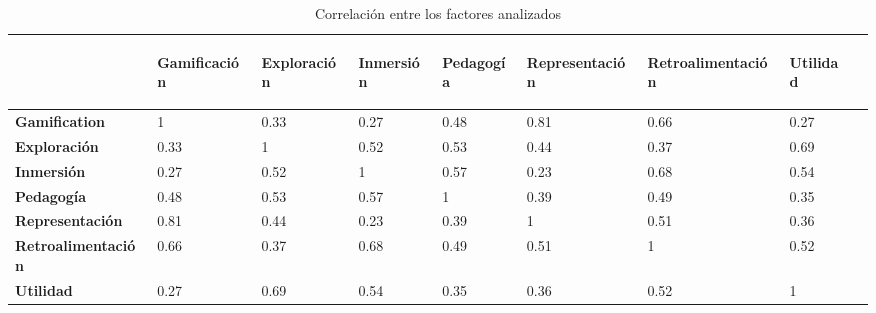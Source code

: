 \begin{table}[!hbt]
\centering
\begin{tabular}{l|lllllllr}
\toprule
        &
\begin{sideways}\textbf{Gamificación}                    \end{sideways}        &
\begin{sideways}\textbf{Exploración}                     \end{sideways}        &
\begin{sideways}\textbf{Inmersión}                       \end{sideways}        &
\begin{sideways}\textbf{Pedagogía}                       \end{sideways}        &
\begin{sideways}\textbf{Representación}                  \end{sideways}        &
\begin{sideways}\textbf{Retroalimentación}               \end{sideways}        &
\begin{sideways}\textbf{Utilidad}                        \end{sideways}      \\
\midrule
\textbf{Gamification}      & 1    & 0.33 & 0.27 & 0.48 & 0.81 & 0.66  & 0.27 \\
\textbf{Exploración}       & 0.33 & 1    & 0.52 & 0.53 & 0.44 & 0.37  & 0.69 \\
\textbf{Inmersión}         & 0.27 & 0.52 & 1    & 0.57 & 0.23 & 0.68  & 0.54 \\
\textbf{Pedagogía}         & 0.48 & 0.53 & 0.57 & 1    & 0.39 & 0.49  & 0.35 \\
\textbf{Representación}    & 0.81 & 0.44 & 0.23 & 0.39 & 1    & 0.51  & 0.36 \\
\textbf{Retroalimentación} & 0.66 & 0.37 & 0.68 & 0.49 & 0.51 & 1     & 0.52 \\
\textbf{Utilidad}          & 0.27 & 0.69 & 0.54 & 0.35 & 0.36 & 0.52  & 1 \\
\bottomrule
\end{tabular}
\caption{Correlación entre los factores analizados} 
\label{tab:subjetiva_correlacion}
\end{table}
